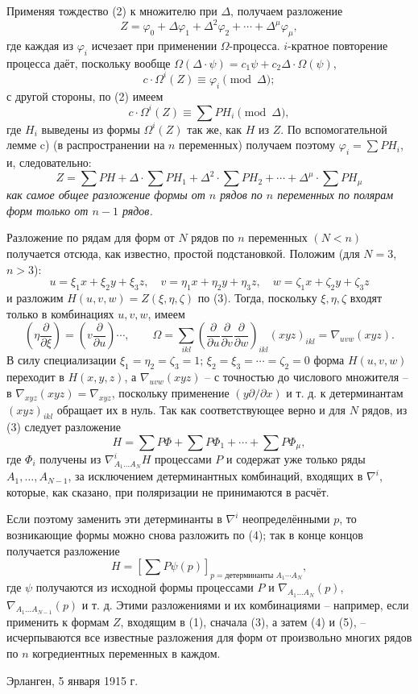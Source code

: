 \documentclass[11pt]{article}
\begin{document}
Применяя тождество (2) к множителю при $\Delta$, получаем разложение
\[
  Z=\varphi_0+\Delta\varphi_1+\Delta^2\varphi_2+\cdots+\Delta^\mu\varphi_\mu,
\]
где каждая из $\varphi_i$ исчезает при применении $\Omega$-процесса. $i$-кратное повторение процесса даёт, поскольку вообще $\Omega(\Delta\cdot\psi)=c_1\psi+c_2\Delta\cdot\Omega(\psi)$,
\[
  c\cdot \Omega^i(Z)\equiv\varphi_i\pmod{\Delta};
\]
с другой стороны, по (2) имеем
\[
  c\cdot\Omega^i(Z)\equiv\sum PH_i\pmod{\Delta},
\]
где $H_i$ выведены из формы $\Omega^i(Z)$ так же, как $H$ из $Z$. По вспомогательной лемме c) (в распространении на $n$ переменных) получаем поэтому $\varphi_i=\sum PH_i$, и, следовательно:
\begin{equation}
  Z=\sum PH+\Delta\cdot\sum PH_1+\Delta^2\cdot\sum PH_2+
  \cdots+\Delta^\mu\cdot\sum PH_\mu
\tag{3}
\end{equation}
\emph{как самое общее разложение формы от $n$ рядов по $n$ переменных по полярам форм только от $n-1$ рядов.}

Разложение по рядам для форм от $N$ рядов по $n$ переменных $(N<n)$ получается отсюда, как известно, простой подстановкой. Положим (для $N=3$, $n>3$):
\[
  u=\xi_1x+\xi_2y+\xi_3z,
  \quad v=\eta_1x+\eta_2y+\eta_3z,
  \quad w=\zeta_1x+\zeta_2y+\zeta_3z
\]
и разложим $H(u,v,w)=Z(\xi,\eta,\zeta)$ по (3). Тогда, поскольку $\xi,\eta,\zeta$ входят только в комбинациях $u,v,w$, имеем
\[
  \left(\eta\frac{\partial}{\partial \xi}\right)=
  \left(v\frac{\partial}{\partial u}\right)\cdots,
  \qquad
  \Omega=\sum_{ikl}\left(\frac{\partial}{\partial u}
  \frac{\partial}{\partial v}
  \frac{\partial}{\partial w}\right)_{ikl}(xyz)_{ikl}
  =\nabla_{uvw}(xyz).
\]
В силу специализации $\xi_1=\eta_2=\zeta_3=1$; $\xi_2=\xi_3=\cdots=\zeta_2=0$ форма $H(u,v,w)$ переходит в $H(x,y,z)$, а $\nabla_{uvw}(xyz)$ -- с точностью до числового множителя -- в $\nabla_{xyz}(xyz)=\nabla_{xyz}$, поскольку применение $(y\partial/\partial x)$ и т. д. к детерминантам $(xyz)_{ikl}$ обращает их в нуль. Так как соответствующее верно и для $N$ рядов, из (3) следует разложение
\begin{equation}
  H=\sum P\Phi+\sum P\Phi_1+\cdots+\sum P\Phi_\mu,
\tag{4}
\end{equation}
где $\Phi_i$ получены из $\nabla^i_{A_1\ldots A_N}H$ процессами $P$ и содержат уже только ряды $A_1,\ldots,A_{N-1}$, за исключением детерминантных комбинаций, входящих в $\nabla^i$, которые, как сказано, при поляризации не принимаются в расчёт.

Если поэтому заменить эти детерминанты в $\nabla^i$ неопределёнными $p$, то возникающие формы можно снова разложить по (4); так в конце концов получается разложение
\begin{equation}
  H=\left[\sum P\psi(p)\right]_{p=\text{детерминанты }A_1\cdots A_N},
\tag{5}
\end{equation}
где $\psi$ получаются из исходной формы процессами $P$ и $\nabla_{A_1\ldots A_N}(p)$, $\nabla_{A_1\ldots A_{N-1}}(p)$ и т. д. Этими разложениями и их комбинациями -- например, если применить к формам $Z$, входящим в (1), сначала (3), а затем (4) и (5), -- исчерпываются все известные разложения для форм от произвольно многих рядов по $n$ когредиентных переменных в каждом.

Эрланген, 5 января 1915 г.
\end{document}
